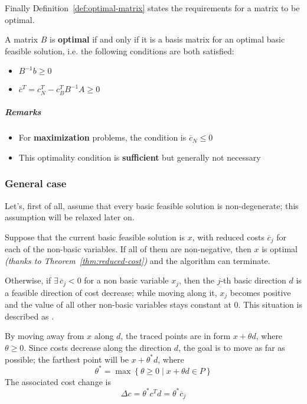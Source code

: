 \documentclass[english]{article}
\begin{document}
Finally Definition~\ref{def:optimal-matrix} states the requirements for a matrix to be optimal.

\begin{definition}
  A matrix \(B\) is \textbf{optimal} if and only if it is a basis matrix for an optimal basic feasible solution, i.e. the following conditions are both satisfied:

  \begin{itemize}
    \item \(B^{-1} b \geq 0\)
    \item \(\overline{c}^T = c^T_N - c^T_B B^{-1} A \geq 0\)
  \end{itemize}
  \label{def:optimal-matrix}
\end{definition}

\subparagraph*{Remarks}
\begin{itemize}[label=\(\rightarrow\)]
  \item For \textbf{maximization} problems, the condition is \(\overline{c}_N \leq 0\)
  \item This optimality condition is \textbf{sufficient} but generally not necessary
\end{itemize}

\subsubsection{General case}

Let's, first of all, assume that every basic feasible solution is non-degenerate;
this assumption will be relaxed later on.

Suppose that the current basic feasible solution is \(x\), with reduced costs \(\overline{c}_j\) for each of the non-basic variables.
If all of them are non-negative, then \(x\) is optimal \textit{(thanks to Theorem~\ref{thm:reduced-cost})} and the algorithm can terminate.

Otherwise, if \(\exists \, \overline{c}_j < 0\) for a non basic variable \(x_j\), then the \(j\)-th basic direction \(d\) is a feasible direction of cost decrease;
while moving along it, \(x_j\) becomes positive and the value of all other non-basic variables stays constant at \(0\).
This situation is described as .

By moving away from \(x\) along \(d\), the traced points are in form \(x + \theta d\), where \(\theta \geq 0\).
Since costs decrease along the direction \(d\), the goal is to move as far as possible;
the farthest point will be \(x + \theta^\ast d\), where
\[ \theta^\ast = \max \left\{ \theta \geq 0 \mid x + \theta d \in P \right\}\]
The associated cost change is
\[ \Delta c = \theta^\ast c^T d = \theta^\ast \overline{c}_j \]
\end{document}
